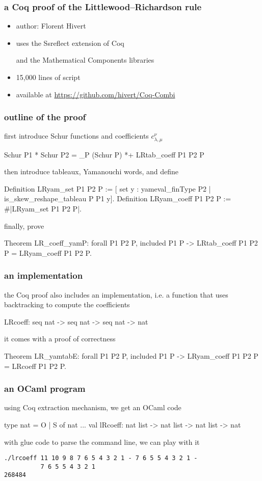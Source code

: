 \documentclass{beamer}
\let\emph\alert
\begin{document}
\begin{frame}\frametitle{a Coq proof of the Littlewood–Richardson rule}
  \begin{itemize}
  \item author: Florent Hivert
  \item uses the Ssreflect extension of Coq \par
    and the Mathematical Components libraries
  \item 15,000 lines of script
  \item available at \url{https://github.com/hivert/Coq-Combi}
  \end{itemize}
\end{frame}

\begin{frame}[fragile]\frametitle{outline of the proof}
  first introduce Schur functions and coefficients $c_{\lambda, \mu}^{\nu}$
\begin{coq}
Schur P1 * Schur P2 =
  \sum_P (Schur P) *+ LRtab_coeff P1 P2 P
\end{coq}
  then introduce tableaux, Yamanouchi words, and define
\begin{coq}
Definition LRyam_set P1 P2 P :=
  [ set y : yameval_finType P2 |
    is_skew_reshape_tableau P P1 y].
Definition LRyam_coeff P1 P2 P :=
  #|LRyam_set P1 P2 P|.
\end{coq}
  finally, prove
\begin{coq}
Theorem LR_coeff_yamP:
  forall P1 P2 P, included P1 P ->
  LRtab_coeff P1 P2 P = LRyam_coeff P1 P2 P.
\end{coq}
\end{frame}

\begin{frame}[fragile]\frametitle{an implementation}
  the Coq proof also includes an \emph{implementation},
  i.e. a function that uses backtracking to compute the coefficients
\begin{coq}
LRcoeff: seq nat -> seq nat -> seq nat -> nat
\end{coq}

\bigskip
it comes with a proof of correctness
\begin{coq}
Theorem LR_yamtabE:
  forall P1 P2 P, included P1 P ->
  LRyam_coeff P1 P2 P = LRcoeff P1 P2 P.
\end{coq}
\end{frame}

\begin{frame}[fragile]\frametitle{an OCaml program}
using Coq extraction mechanism, we get an OCaml code
\begin{ocaml}
type nat = O | S of nat
...
val lRcoeff: nat list -> nat list -> nat list -> nat
\end{ocaml}

\bigskip
with glue code to parse the command line, we can play with it
\begin{verbatim}
./lrcoeff 11 10 9 8 7 6 5 4 3 2 1 - 7 6 5 5 4 3 2 1 -
          7 6 5 5 4 3 2 1
268484
\end{verbatim}
\end{frame}
\end{document}
